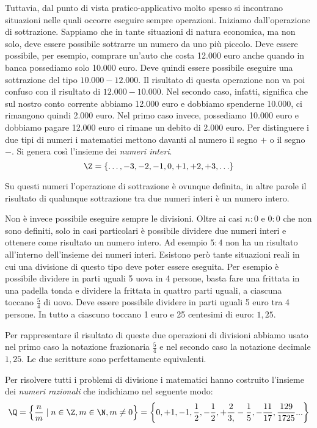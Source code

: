 Tuttavia, dal punto di vista pratico-applicativo molto spesso si incontrano 
situazioni nelle quali occorre eseguire sempre operazioni. Iniziamo 
dall'operazione di sottrazione. Sappiamo che in tante situazioni di natura 
economica, ma non solo, deve essere possibile sottrarre un numero da uno più 
piccolo. Deve essere possibile, per esempio, comprare un'auto che costa 
12.000 
euro anche quando in banca possediamo solo 10.000 euro. Deve quindi essere 
possibile eseguire una sottrazione del tipo \(10.000-12.000\). Il risultato 
di 
questa operazione non va poi confuso con il risultato di \(12.000-10.000\). 
Nel 
secondo caso, infatti, significa che sul nostro conto corrente abbiamo 12.000 
euro e dobbiamo spenderne 10.000, ci rimangono quindi 2.000 euro. Nel primo 
caso 
invece, possediamo 10.000 euro e dobbiamo pagare
12.000 euro ci rimane un debito di 2.000 euro. Per distinguere i due tipi di 
numeri i matematici mettono davanti al numero il segno \(+\) o il segno \(-\). 
Si 
genera così l'insieme dei \emph{numeri interi}.
\[\Z=\{\ldots,-3,-2,-1,0,+1,+2,+3,\ldots\}\]

Su questi numeri l'operazione di sottrazione è ovunque definita, in altre 
parole 
il risultato di qualunque sottrazione tra due numeri interi è un numero 
intero.

Non è invece possibile eseguire sempre le divisioni. Oltre ai casi \(n:0\) e 
\(0:0\) che non sono definiti, solo in casi particolari è possibile dividere 
due numeri interi e ottenere come risultato un numero intero. Ad esempio 
\(5:4\) 
non ha un risultato all'interno dell'insieme dei numeri interi. 
Esistono però tante situazioni reali in cui una divisione di questo tipo deve 
poter essere eseguita. Per esempio è possibile dividere in parti uguali 5 
uova 
in 4 persone, basta fare una frittata in una padella tonda e dividere la 
frittata in quattro parti uguali, a ciascuna toccano \(\frac{5}{4}\) di uovo. 
Deve
essere possibile dividere in parti uguali 5 euro tra 4 persone. 
In tutto a ciascuno toccano 1 euro e 25 centesimi di euro: \(1,25\).

Per rappresentare il risultato di queste due operazioni di divisioni abbiamo 
usato nel primo caso la notazione frazionaria \(\frac{5}{4}\) e nel secondo 
caso 
la notazione decimale \(1,25\). Le due scritture sono perfettamente 
equivalenti.

Per risolvere tutti i problemi di divisione i matematici hanno costruito 
l'insieme dei \emph{numeri razionali} che indichiamo nel seguente modo:
\[
\Q=\left\{\frac{n}{m} \mid n\in \Z,m\in \N,m\neq
0\right\}=\left\{0,+1,-1,\frac{1}{2},-\frac{1}{2},+\frac{2}{3,}-\frac{1}{5},
-\frac{11}{17},\frac{129}{1725}...\right\}
\]

